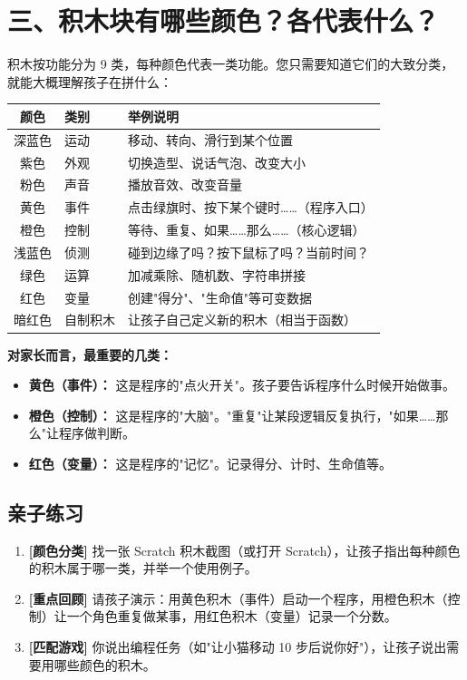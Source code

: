 \documentclass[a4paper,12pt]{ctexart}
\begin{document}
\section*{三、积木块有哪些颜色？各代表什么？}

积木按功能分为 9 类，每种颜色代表一类功能。您只需要知道它们的大致分类，就能大概理解孩子在拼什么：

\vspace{0.3cm}
\begin{center}
\begin{tabular}{|c|l|l|}
\hline
\textbf{颜色} & \textbf{类别} & \textbf{举例说明} \\ \hline
深蓝色 & 运动 & 移动、转向、滑行到某个位置 \\ \hline
紫色 & 外观 & 切换造型、说话气泡、改变大小 \\ \hline
粉色 & 声音 & 播放音效、改变音量 \\ \hline
黄色 & 事件 & 点击绿旗时、按下某个键时……（程序入口） \\ \hline
橙色 & 控制 & 等待、重复、如果……那么……（核心逻辑） \\ \hline
浅蓝色 & 侦测 & 碰到边缘了吗？按下鼠标了吗？当前时间？ \\ \hline
绿色 & 运算 & 加减乘除、随机数、字符串拼接 \\ \hline
红色 & 变量 & 创建"得分"、"生命值"等可变数据 \\ \hline
暗红色 & 自制积木 & 让孩子自己定义新的积木（相当于函数） \\ \hline
\end{tabular}
\end{center}

\textbf{对家长而言，最重要的几类：}
\begin{itemize}
  \item \textbf{黄色（事件）：} 这是程序的"点火开关"。孩子要告诉程序什么时候开始做事。
  \item \textbf{橙色（控制）：} 这是程序的"大脑"。"重复"让某段逻辑反复执行，"如果……那么"让程序做判断。
  \item \textbf{红色（变量）：} 这是程序的"记忆"。记录得分、计时、生命值等。
\end{itemize}

\subsection*{亲子练习}

\begin{enumerate}
  \item \textbf{[颜色分类]} 找一张 Scratch 积木截图（或打开 Scratch），让孩子指出每种颜色的积木属于哪一类，并举一个使用例子。
  \item \textbf{[重点回顾]} 请孩子演示：用黄色积木（事件）启动一个程序，用橙色积木（控制）让一个角色重复做某事，用红色积木（变量）记录一个分数。
  \item \textbf{[匹配游戏]} 你说出编程任务（如"让小猫移动 10 步后说你好"），让孩子说出需要用哪些颜色的积木。
\end{enumerate}
\end{document}
